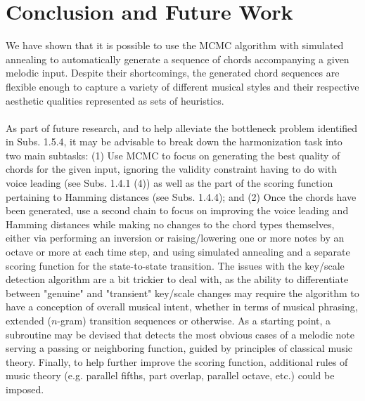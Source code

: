 \documentclass[twoside]{article}
\begin{document}
	\section{Conclusion and Future Work}
	We have shown that it is possible to use the MCMC algorithm with simulated annealing to automatically generate a sequence of chords accompanying a given melodic input. Despite their shortcomings, the generated chord sequences are flexible enough to capture a variety of different musical styles and their respective aesthetic qualities represented as sets of heuristics.
	\\\\
	As part of future research, and to help alleviate the bottleneck problem identified in Subs. 1.5.4, it may be advisable to break down the harmonization task into two main subtasks: (1) Use MCMC to focus on generating the best quality of chords for the given input, ignoring the validity constraint having to do with voice leading (see Subs. 1.4.1 (4)) as well as the part of the scoring function pertaining to Hamming distances (see Subs. 1.4.4); and (2) Once the chords have been generated, use a second chain to focus on improving the voice leading and Hamming distances while making no changes to the chord types themselves, either via performing an inversion or raising/lowering one or more notes by an octave or more at each time step, and using simulated annealing and a separate scoring function for the state-to-state transition. The issues with the key/scale detection algorithm are a bit trickier to deal with, as the ability to differentiate between "genuine" and "transient" key/scale changes may require the algorithm to have a conception of overall musical intent, whether in terms of musical phrasing, extended ($n$-gram) transition sequences or otherwise. As a starting point, a subroutine may be devised that detects the most obvious cases of a melodic note serving a passing or neighboring function, guided by principles of classical music theory. Finally, to help further improve the scoring function, additional rules of music theory (e.g. parallel fifths, part overlap, parallel octave, etc.) could be imposed.
\end{document}
